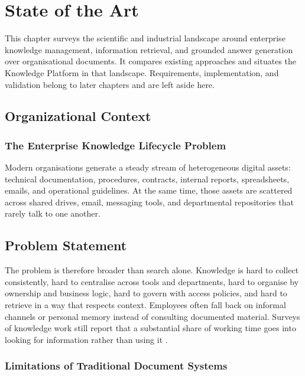 \chapter{State of the Art}
\label{ch:state-of-the-art}

This chapter surveys the scientific and industrial landscape around enterprise
knowledge management, information retrieval, and grounded answer generation over
organisational documents. It compares existing approaches and situates the
Knowledge Platform in that landscape. Requirements, implementation, and
validation belong to later chapters and are left aside here.

\section{Organizational Context}
\label{sec:context}

\subsection{The Enterprise Knowledge Lifecycle Problem}

Modern organisations generate a steady stream of heterogeneous digital assets:
technical documentation, procedures, contracts, internal reports, spreadsheets,
emails, and operational guidelines. At the same time, those assets are scattered
across shared drives, email, messaging tools, and departmental repositories that
rarely talk to one another.

\section{Problem Statement}

The problem is therefore broader than search alone. Knowledge is hard to collect
consistently, hard to centralise across tools and departments, hard to organise
by ownership and business logic, hard to govern with access policies, and hard
to retrieve in a way that respects context. Employees often fall back on informal
channels or personal memory instead of consulting documented material. Surveys of
knowledge work still report that a substantial share of working time goes into
looking for information rather than using it \cite{gao2024rag-survey}.

\subsection{Limitations of Traditional Document Systems}

